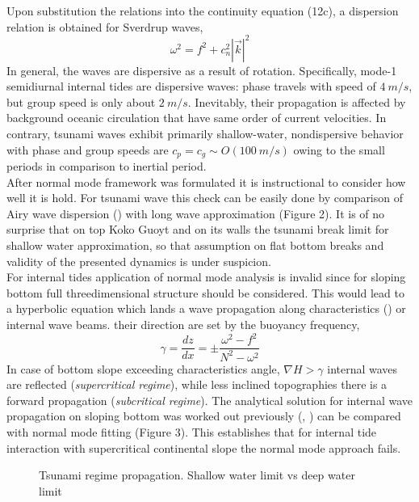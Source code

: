 Upon substitution the relations into the continuity equation (12c), a dispersion relation is obtained for Sverdrup waves,
\begin{equation}
\omega^2 = f^2 + c^2_n |\vec{k}|^2
\end{equation}
In general, the waves are dispersive as a result of rotation. Specifically, mode-1 semidiurnal internal tides are dispersive waves: phase travels with speed of $4~m/s$, but group speed is only about $2~m/s$. Inevitably, their propagation is affected by background oceanic circulation that have same order of current velocities. In contrary, tsunami waves exhibit primarily shallow-water, nondispersive behavior with phase and group speeds are $c_p = c_g \sim O(100~m/s)$ owing to the small periods in comparison to inertial period.\\
After normal mode framework was formulated it is instructional to consider how well it is hold. For tsunami wave this check can be easily done by comparison of Airy wave dispersion (\cite{kundu2008fluid}) with long wave approximation (Figure 2). It is of no surprise that on top Koko Guoyt and on its walls the tsunami break limit for shallow water approximation, so that assumption on flat bottom breaks and validity of the presented dynamics is under suspicion.\\
For internal tides application of normal mode analysis is invalid since for sloping bottom full threedimensional structure should be considered. This would lead to a hyperbolic equation which lands a wave propagation along characteristics (\cite{sandstrom1969effect}) or internal wave beams. their direction are set by the buoyancy frequency,
\begin{equation}
\gamma = \frac{dz}{dx} = \pm \frac{\omega^2 - f^2}{N^2 - \omega^2}
\end{equation}
In case of bottom slope exceeding characteristics angle, $\nabla H > \gamma$ internal waves are reflected (\textit{supercritical regime}), while less inclined topographies there is a forward propagation (\textit{subcritical regime}). The analytical solution for internal wave propagation on sloping bottom was worked out previously (\cite{wunsch1968propagation}, \cite{wunsch1969progressive}) can be compared with normal mode fitting (Figure 3). This  establishes that for internal tide interaction with supercritical continental slope the normal mode approach fails. 

\begin{figure}
\caption{Tsunami regime propagation. Shallow water limit vs deep water limit}
\end{figure}

